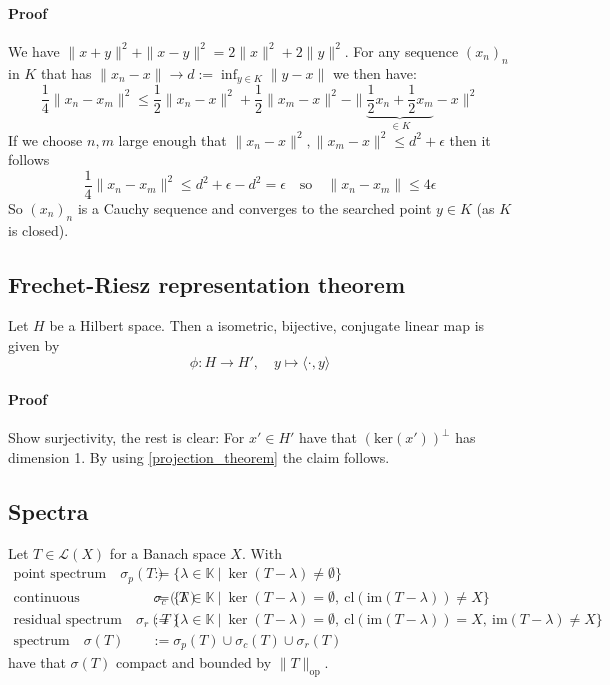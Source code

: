 \documentclass{scrartcl}
\begin{document}
\paragraph{Proof} We have $\| x + y \|^2 + \| x - y \|^2 = 2\| x \|^2 + 2\| y \|^2$. For any sequence $(x_n)_n$ in $K$ that has $\| x_n - x \| \to d := \inf_{y \in K} \| y - x\|$ we then have:
\begin{equation*}
    \frac 1 4 \| x_n - x_m \|^2 \leq \frac 1 2 \| x_n - x \|^2 + \frac 1 2 \| x_m - x \|^2 - \| \underbrace{\frac 1 2 x_n + \frac 1 2 x_m}_{\in K} - x \|^2 
\end{equation*}
If we choose $n, m$ large enough that $\| x_n - x \|^2, \| x_m - x \|^2 \leq d^2 + \epsilon$ then it follows
\begin{equation*}
    \frac 1 4 \| x_n - x_m \|^2 \leq d^2 + \epsilon - d^2 = \epsilon \quad \text{so} \quad \| x_n - x_m \| \leq 4\epsilon
\end{equation*}
So $(x_n)_n$ is a Cauchy sequence and converges to the searched point $y \in K$ (as $K$ is closed).

\subsection{Frechet-Riesz representation theorem}
Let $H$ be a Hilbert space. Then a isometric, bijective, conjugate linear map is given by
\begin{equation*}
    \phi: H \to H', \quad y \mapsto \langle \cdot , y \rangle
\end{equation*}
\paragraph{Proof} Show surjectivity, the rest is clear: For $x' \in H'$ have that $(\mathrm{ker}(x'))^\perp$ has dimension 1. By using \ref{projection_theorem} the claim follows.

\subsection{Spectra}
Let $T \in \mathcal{L}(X)$ for a Banach space $X$.
With
\begin{align*}
    \text{point spectrum} \quad \sigma_p(T) &:= \{ \lambda \in \mathbb{K} \ | \ \ker(T - \lambda) \neq \emptyset \} \\
    \text{continuous spectrum} \quad \sigma_c(T) &:= \{ \lambda \in \mathbb{K} \ | \ \ker(T - \lambda) = \emptyset, \ \mathrm{cl}(\mathrm{im}(T - \lambda)) \neq X \} \\
    \text{residual spectrum} \quad \sigma_r(T) &:= \{ \lambda \in \mathbb{K} \ | \ \ker(T - \lambda) = \emptyset, \ \mathrm{cl}(\mathrm{im}(T - \lambda)) = X, \ \mathrm{im}(T - \lambda) \neq X \} \\
    \text{spectrum} \quad \sigma(T) &:= \sigma_p(T) \cup \sigma_c(T) \cup \sigma_r(T)
\end{align*}
have that $\sigma(T)$ compact and bounded by $\| T \|_{\mathrm{op}}$.
\end{document}
